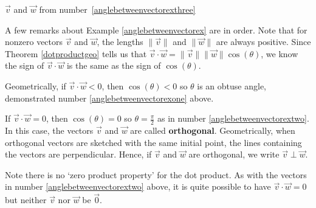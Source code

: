 \documentclass{ximera}
\begin{document}
\begin{example}
\begin{explanation}
\begin{enumerate}
\begin{center}

\vspace{0.5em}

$\overrightarrow{v}$ and $\overrightarrow{w}$ from number~\ref{anglebetweenvectorexthree}

\end{center}

\end{enumerate}
\end{explanation}
\end{example}

 

A few remarks about Example \ref{anglebetweenvectorex} are in order.  Note that for nonzero vectors $\overrightarrow{v}$ and $\overrightarrow{w}$, the lengths $\| \overrightarrow{v} \|$ and $\| \overrightarrow{w} \|$ are always positive. Since Theorem \ref{dotproductgeo} tells us that $\overrightarrow{v} \cdot \overrightarrow{w} =  \| \overrightarrow{v} \| \| \overrightarrow{w} \| \cos(\theta)$, we know the sign of $\overrightarrow{v} \cdot \overrightarrow{w}$ is the same as the sign of $\cos(\theta)$. 

 

Geometrically, if $\overrightarrow{v} \cdot \overrightarrow{w} < 0$, then $\cos(\theta) < 0$ so $\theta$ is an obtuse angle, demonstrated number \ref{anglebetweenvectorexone} above.  

 

If $\overrightarrow{v} \cdot \overrightarrow{w}  = 0$, then $\cos(\theta) = 0$ so $\theta = \frac{\pi}{2}$ as in number \ref{anglebetweenvectorextwo}. In this case, the vectors $\overrightarrow{v}$ and $\overrightarrow{w}$ are called \textbf{orthogonal}.  Geometrically, when orthogonal vectors are sketched with the same initial point, the lines containing the vectors are perpendicular. Hence, if $\overrightarrow{v}$ and $\overrightarrow{w}$ are orthogonal, we write $\overrightarrow{v} \perp \overrightarrow{w}$.    

 

Note there is no `zero product property' for the dot product.  As with the vectors in number \ref{anglebetweenvectorextwo} above, it is quite possible to have $\overrightarrow{v} \cdot \overrightarrow{w} = 0$ but neither $\overrightarrow{v}$ nor $\overrightarrow{w}$ be $\overrightarrow{0}$.
\end{document}
